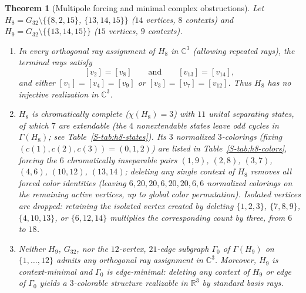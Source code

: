 \documentclass[aps,pra,reprint,superscriptaddress,longbibliography,nofootinbib,floatfix,10pt]{revtex4-2}
\newtheorem{theorem}{Theorem}
\theoremstyle{definition}\newtheorem{definition}[theorem]{Definition}
\theoremstyle{remark}\newtheorem{remark}[theorem]{Remark}
\newcommand{\C}{\mathbb C}\newcommand{\R}{\mathbb R}\newcommand{\Q}{\mathbb Q}
\begin{document}
\begin{theorem}[Multipole forcing and minimal complex obstructions]\label{m:thm:multipole}\label{m:thm:g32}
Let $H_8=G_{32}\setminus\{\{8,2,15\}$, $\{13,14,15\}\}$ ($14$ vertices, $8$ contexts) and $H_9=G_{32}\setminus\{\{13,14,15\}\}$ ($15$ vertices, $9$ contexts).
\begin{enumerate}
\item In every orthogonal ray assignment of $H_8$ in $\C^3$ (allowing repeated rays), the terminal rays satisfy
\begin{equation}\label{m:eq:multipole-forcing}
[v_2]=[v_8]\qquad\text{and}\qquad [v_{13}]=[v_{14}],
\end{equation}
and either $[v_1]=[v_4]=[v_9]$ or $[v_3]=[v_7]=[v_{12}]$. Thus $H_8$ has no injective realization in $\C^3$.
\item $H_8$ is chromatically complete ($\chi(H_8)=3$) with $11$ unital separating states, of which $7$ are extendable (the $4$ nonextendable states leave odd cycles in $\Gamma(H_8)$; see Table~\ref{S-tab:h8-states}). Its $3$ normalized $3$-colorings (fixing $(c(1),c(2),c(3))=(0,1,2)$) are listed in Table~\ref{S-tab:h8-colors}, forcing the $6$ chromatically inseparable pairs $(1,9)$, $(2,8)$, $(3,7)$, $(4,6)$, $(10,12)$, $(13,14)$; deleting any single context of $H_8$ removes all forced color identities (leaving $6,20,20,6,20,20,6,6$ normalized colorings on the remaining active vertices, up to global color permutation). Isolated vertices are dropped: retaining the isolated vertex created by deleting $\{1,2,3\}$, $\{7,8,9\}$, $\{4,10,13\}$, or $\{6,12,14\}$ multiplies the corresponding count by three, from $6$ to $18$.
\item Neither $H_9$, $G_{32}$, nor the $12$-vertex, $21$-edge subgraph $\Gamma_0$ of $\Gamma(H_9)$ on $\{1,\ldots,12\}$ admits any orthogonal ray assignment in $\C^3$. Moreover, $H_9$ is context-minimal and $\Gamma_0$ is edge-minimal: deleting any context of $H_9$ or edge of $\Gamma_0$ yields a $3$-colorable structure realizable in $\R^3$ by standard basis rays.
\end{enumerate}
\end{theorem}
\end{document}
